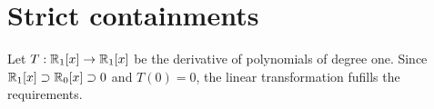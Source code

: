 \section{Strict containments}
Let $T: \mathbb{R}_1[x] \rightarrow \mathbb{R}_1[x]$ 
be the derivative of polynomials of degree one.
Since $\mathbb{R}_1[x] \supset \mathbb{R}_0[x] \supset 0$ and $T(0) = 0$,
the linear transformation fufills the requirements.